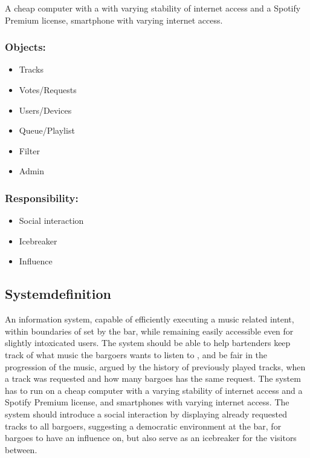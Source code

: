 A cheap computer with a with varying stability of internet access and a Spotify Premium license, smartphone with varying internet access.

\subsubsection{Objects:}
\begin{itemize}
	\item Tracks
	\item Votes/Requests	
	\item Users/Devices
	\item Queue/Playlist
	\item Filter
	\item Admin
\end{itemize}


\subsubsection{Responsibility:}
\begin{itemize}
	\item Social interaction
	\item Icebreaker	
	\item Influence 
\end{itemize}

\subsection{Systemdefinition}

An information system, capable of efficiently executing a music related intent, within boundaries of set by the bar, while remaining easily accessible even for slightly intoxicated users.  The system should be able to help bartenders keep track of what music the bargoers wants to listen to , and be fair in the progression of the music, argued by the history of previously played tracks, when a track was requested and how many bargoes has the same request. The system has to run on a cheap computer with a varying stability of internet access and a Spotify Premium license, and smartphones with varying internet access. The system should introduce a social interaction by displaying already requested tracks to all bargoers, suggesting a democratic environment at the bar, for bargoes to have an influence on, but also serve as an icebreaker for the visitors between.